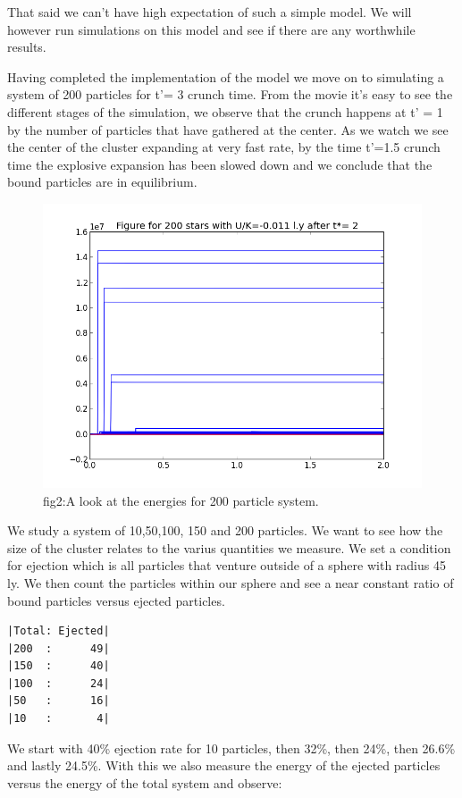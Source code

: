 \documentclass{article}
\begin{document}
That said we can't have high expectation of such a simple model. We will however run simulations on this model and see
if there are any worthwhile results.

Having completed the implementation of the model we move on to simulating a system of 200 particles for t'= 3 crunch time.
From the movie it's easy to see the different stages of the simulation, we observe that the crunch happens at t' = 1 by
the number of particles that have gathered at the center. As we watch we see the center of the cluster expanding at 
very fast rate, by the time t'=1.5 crunch time the explosive expansion has been slowed down and we conclude that the
bound particles are in equilibrium.
\begin{figure}[h!]
  \centering
  \includegraphics[scale=0.5]{d1-200.png}
  \caption{fig2:A look at the energies for 200 particle system.}
\end{figure}
We study a system of 10,50,100, 150 and 200 particles. We want to see
how the size of the cluster relates to the varius quantities we measure.
We set a condition for ejection which is all particles that venture outside
of a sphere with radius 45 ly. We then count the particles within our sphere
and see a near constant ratio of bound particles  versus ejected particles. 
\begin{verbatim}
|Total: Ejected|
|200  :      49|
|150  :      40|
|100  :      24|
|50   :      16|
|10   :       4|
\end{verbatim}
We start with 40\% ejection rate for 10 particles, then 32\%, then 24\%, then 26.6\% and
lastly 24.5\%.
With this we also measure the energy of the ejected particles versus the energy of the
total system and observe:
\end{document}
